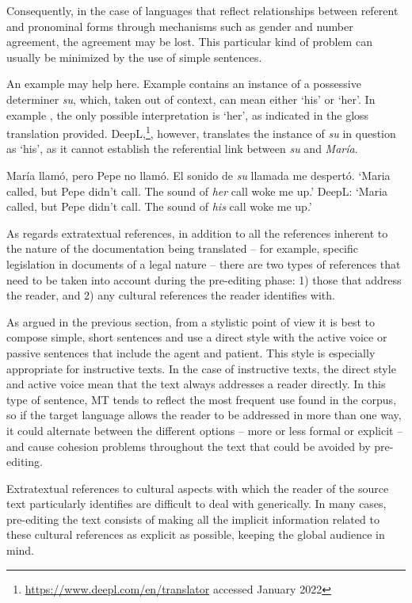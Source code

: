 \documentclass[output=paper,colorlinks,citecolor=brown,
]{langscibook}
\begin{document}
Consequently, in the case of languages that reflect relationships between referent and pronominal forms through mechanisms such as gender and number agreement, the agreement may be lost. This particular kind of problem can usually be minimized by the use of simple sentences.

An example may help here. Example  contains an instance of a possessive determiner \textit{su}, which, taken out of context, can mean either ‘his’ or ‘her’. In example , the only possible interpretation is ‘her’, as indicated in the gloss translation provided. DeepL,\footnote{\url{https://www.deepl.com/en/translator} accessed January 2022}, however, translates the instance of \textit{su} in question as ‘his’, as it cannot establish the referential link between \textit{su} and \textit{María}.

\ea\label{ex:sanchez:1}
María llamó,  pero Pepe no llamó.   El sonido de \textit{su} llamada me despertó. 
\glt ‘Maria called, but  Pepe didn’t call. The sound of \textit{her} call woke me up.’
\glt DeepL: `Maria called, but Pepe didn't call. The sound of \textit{his} call woke me up.'
\z

As regards extratextual references, in addition to all the references inherent to the nature of the documentation being translated – for example, specific legislation in documents of a legal nature – there are two types of references that need to be taken into account during the pre-editing phase: 1) those that address the reader, and 2) any cultural references the reader identifies with.

As argued in the previous section, from a stylistic point of view it is best to compose simple, short sentences and use a direct style with the active voice or passive sentences that include the agent and patient. This style is especially appropriate for instructive texts. In the case of instructive texts, the direct style and active voice mean that the text always addresses a reader directly. In this type of sentence, MT tends to reflect the most frequent use found in the corpus, so if the target language allows the reader to be addressed in more than one way, it could alternate between the different options – more or less formal or explicit – and cause cohesion problems throughout the text that could be avoided by pre-editing.

Extratextual references to cultural aspects with which the reader of the source text particularly identifies are  difficult to deal with generically. In many cases, pre-editing the text consists of making all the implicit information related to these cultural references as explicit as possible, keeping the global audience in mind. 
\end{document}
